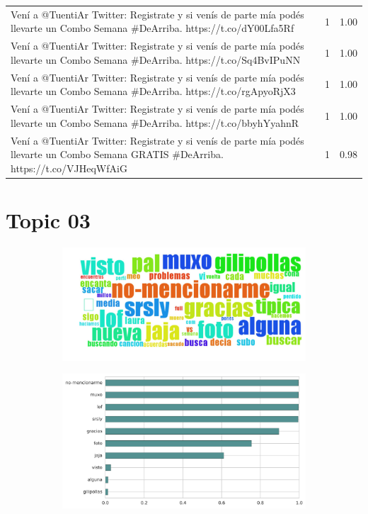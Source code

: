 \begin{longtable}{p{12.5cm}rr}
Vení a @TuentiAr Twitter: Registrate y si venís de parte mía podés llevarte un Combo Semana \#DeArriba. https://t.co/dY00Lfa5Rf & 1 & 1.00 \\
Vení a @TuentiAr Twitter: Registrate y si venís de parte mía podés llevarte un Combo Semana \#DeArriba. https://t.co/Sq4BvIPuNN & 1 & 1.00 \\
Vení a @TuentiAr Twitter: Registrate y si venís de parte mía podés llevarte un Combo Semana \#DeArriba. https://t.co/rgApyoRjX3 & 1 & 1.00 \\
Vení a @TuentiAr Twitter: Registrate y si venís de parte mía podés llevarte un Combo Semana \#DeArriba. https://t.co/bbyhYyahnR & 1 & 1.00 \\
Vení a @TuentiAr Twitter: Registrate y si venís de parte mía podés llevarte un Combo Semana GRATIS \#DeArriba. https://t.co/VJHeqWfAiG & 1 & 0.98 \\

\end{longtable}
\clearpage

\section{Topic 03}

\begin{figure}[htbp!]
    \centering
    \begin{subfigure}[b]{0.49\textwidth}
        \includegraphics[width=\textwidth]{twitter_all/report_images/topic-03-wordcloud.jpg}
    \end{subfigure}
    \begin{subfigure}[b]{0.49\textwidth}
        \includegraphics[width=\textwidth]{twitter_all/report_images/topic-03-terms.jpg}
    \end{subfigure}
\end{figure}

